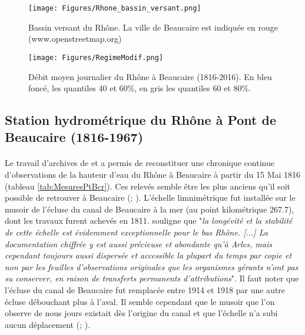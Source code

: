 \documentclass[11pt]{article}
\begin{document}
	\begin{figure}[h]
	\centering
		\texttt{[image: Figures/Rhone\_bassin\_versant.png]}
        \caption{Bassin versant du Rhône. La ville de Beaucaire est indiquée en rouge (www.openstreetmap.org)}	
		\label{fig:BV}
	\end{figure}
	
	\begin{figure}[h]
	\centering
		\texttt{[image: Figures/RegimeModif.png]}
        \caption{Débit moyen journalier du Rhône à Beaucaire (1816-2016). En bleu foncé, les quantiles 40 et 60\%, en gris les quantiles 60 et 80\%.}	
		\label{fig:Regime}
	\end{figure}
	
	
\FloatBarrier

	\subsection{Station hydrométrique du Rhône à Pont de Beaucaire (1816-1967)}
	
	\paragraph{} Le travail d'archives de \citet{pichard_les_1995} et \citet{pichard_hydro-climatology_2017} a permis de reconstituer une chronique continue d'observations de la hauteur d'eau du Rhône à Beaucaire à partir du 15 Mai 1816 (tableau \ref{tab:MesuresPtBcr}). Ces relevés semble être les plus anciens qu'il soit possible de retrouver à Beaucaire (\citet{pichard_les_1995}; \citet{parde_regime_1925}). L'échelle limnimétrique fut installée sur le musoir de l'écluse du canal de Beaucaire à la mer (au point kilométrique 267.7), dont les travaux furent achevés en 1811. \citet{pichard_hauteurs_2013} souligne que "\textit{la longévité et la stabilité de cette échelle est évidemment exceptionnelle pour le bas Rhône. [...] La documentation chiffrée y est aussi précieuse et abondante qu'à Arles, mais cependant toujours aussi dispersée et accessible la plupart du temps par copie et non par les feuilles d'observations originales que les organismes gérants n'ont pas su conserver, en raison de transferts permanents d'attributions}". Il faut noter que l'écluse du canal de Beaucaire fut remplacée entre 1914 et 1918 par une autre écluse débouchant plus à l'aval. Il semble cependant que le musoir que l'on observe de nous jours existait dès l'origine du canal et que l'échelle n'a subi aucun déplacement (\citet{pichard_hauteurs_2013}; \citet{bard_actualisation_2018}). 
	
\end{document}
